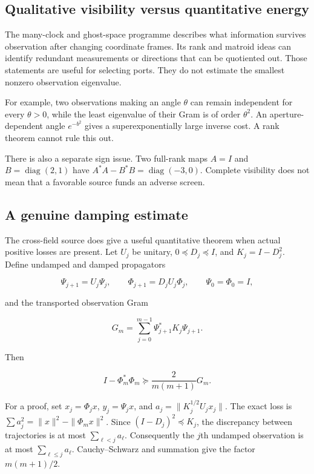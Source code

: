 \documentclass[
  10pt,
  a4paper,
  10pt,
  oneside,
  openany]{book}
\begin{document}
\subsection{Qualitative visibility versus quantitative
energy}\label{qualitative-visibility-versus-quantitative-energy}

The many-clock and ghost-space programme describes what information
survives observation after changing coordinate frames. Its rank and
matroid ideas can identify redundant measurements or directions that can
be quotiented out. Those statements are useful for selecting ports. They
do not estimate the smallest nonzero observation eigenvalue.

For example, two observations making an angle \(\theta\) can remain
independent for every \(\theta>0\), while the least eigenvalue of their
Gram is of order \(\theta^2\). An aperture-dependent angle \(e^{-b^2}\)
gives a superexponentially large inverse cost. A rank theorem cannot
rule this out.

There is also a separate sign issue. Two full-rank maps \(A=I\) and
\(B=\operatorname{diag}(2,1)\) have
\(A^{*}A-B^{*}B=\operatorname{diag}(-3,0)\). Complete visibility does
not mean that a favorable source funds an adverse screen.

\subsection{A genuine damping
estimate}\label{a-genuine-damping-estimate}

The cross-field source does give a useful quantitative theorem when
actual positive losses are present. Let \(U_j\) be unitary,
\(0\preceq D_j\preceq I\), and \(K_j=I-D_j^2\). Define undamped and
damped propagators

\[
 \Psi_{j+1}=U_j\Psi_j,\qquad
 \Phi_{j+1}=D_jU_j\Phi_j,\qquad \Psi_0=\Phi_0=I,
\]

and the transported observation Gram

\[
 G_m=\sum_{j=0}^{m-1}\Psi_{j+1}^{*}K_j\Psi_{j+1}.
\]

Then

\[
 I-\Phi_m^{*}\Phi_m\succeq\frac{2}{m(m+1)}G_m.
 \tag{45.1}\label{eq:45.1}
\]

For a proof, set \(x_j=\Phi_jx\), \(y_j=\Psi_jx\), and
\(a_j=\|K_j^{1/2}U_jx_j\|\). The exact loss is
\(\sum a_j^2=\|x\|^2-\|\Phi_mx\|^2\). Since \((I-D_j)^2\preceq K_j\),
the discrepancy between trajectories is at most \(\sum_{\ell<j}a_\ell\).
Consequently the \(j\)th undamped observation is at most
\(\sum_{\ell\le j}a_\ell\). Cauchy--Schwarz and summation give the
factor \(m(m+1)/2\).
\end{document}
